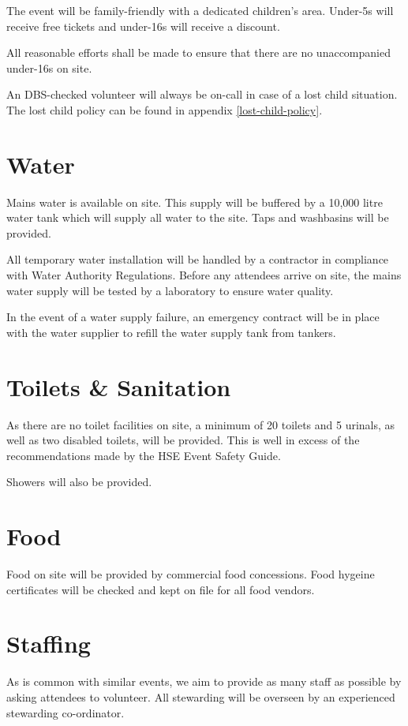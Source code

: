 The event will be family-friendly with a dedicated children's area. Under-5s will receive free tickets
and under-16s will receive a discount.

All reasonable efforts shall be made to ensure that there are no unaccompanied under-16s on site.

An DBS-checked volunteer will always be on-call in case of a lost child situation. The lost child
policy can be found in appendix \ref{lost-child-policy}.

\section{Water}
Mains water is available on site. This supply will be buffered by a 10,000 litre water tank which will
supply all water to the site. Taps and washbasins will be provided.

All temporary water installation will be handled by a contractor in compliance with Water Authority Regulations.
Before any attendees arrive on site, the mains water supply will be tested by a laboratory to ensure water quality.

In the event of a water supply failure, an emergency contract will be in place with the water supplier
to refill the water supply tank from tankers.

\section{Toilets \& Sanitation}

As there are no toilet facilities on site, a minimum of 20 toilets and 5 urinals, as well as two disabled toilets,
will be provided. This is well in excess of the recommendations made by the HSE Event Safety Guide.

Showers will also be provided.

\section{Food}

Food on site will be provided by commercial food concessions. Food hygeine certificates will be checked and kept on file for all food vendors.

\section{Staffing}

As is common with similar events, we aim to provide as many staff as possible
by asking attendees to volunteer. All stewarding will be overseen by an experienced stewarding co-ordinator.


